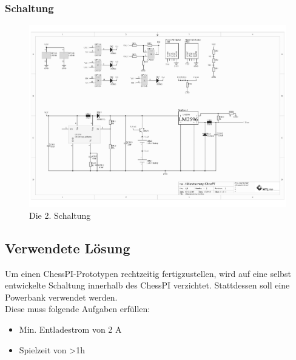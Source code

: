 \documentclass[12pt,a4paper]{article}
\begin{document}
\subsubsection{Schaltung}
\label{SUBSUBSEC:CIRCUIT-2}
\begin{figure}[H]
  \centering
		\includegraphics[scale=0.7, angle=90]{graphics/20171104-shematics.pdf}
		\caption{Die 2. Schaltung}
		\label{fig:circuit2}
\end{figure}

\newpage
\subsection{Verwendete Lösung}
\label{SUBSEC:POWERBANK}

Um einen ChessPI-Prototypen rechtzeitig fertigzustellen, wird auf eine selbst entwickelte Schaltung innerhalb des ChessPI verzichtet. Stattdessen soll eine Powerbank verwendet werden. \\
Diese muss folgende Aufgaben erfüllen:
\begin{itemize}
	\item{Min. Entladestrom von 2 A}
	\item{Spielzeit von >1h}
\end{itemize}
\end{document}
